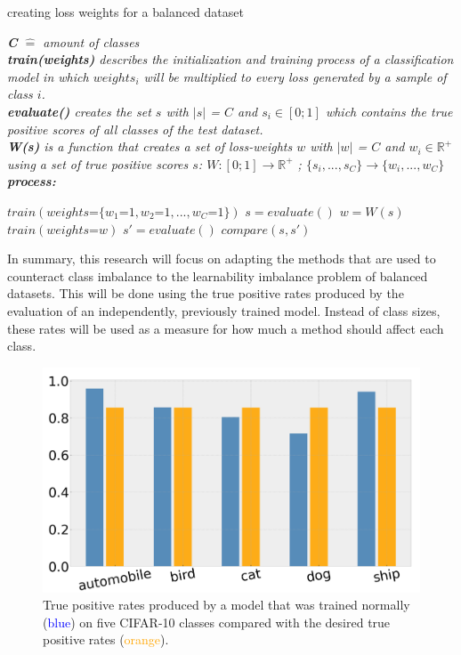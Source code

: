 \documentclass[journal]{IEEEtran}
\begin{document}
\begin{algorithm}[H]
        \caption{creating loss weights for a balanced dataset}

        \textit{\textbf{C} $\hat{=}$ amount of classes}
        \\ \textit{\textbf{train(weights)} describes the initialization and training process of a classification model in which $weights_i$ will be multiplied to every loss generated by a sample of class $i$.}
        \\ \textit{\textbf{evaluate()} creates the set $s$ with $\left|s\right|$ = $C$ and $s_i \in [0;1]$ which contains the true positive scores of all classes of the test dataset.}
        \\ \textit{\textbf{W(s)} is a function that creates a set of loss-weights $w$ with $\left|w\right|$ = $C$ and $w_i \in \mathbb{R}^{+}$ using a set of true positive scores $s$: $W: [0;1] \rightarrow \mathbb{R}^{+}$ ; $\{s_i,...,s_C\} \rightarrow \{w_i,...,w_C\}$ }
        \\ \textit{\textbf{process:}}
        \begin{algorithmic}[1]
         \STATE $train(weights\texttt{=}\{w_1\texttt{=}1, w_2\texttt{=}1, ..., w_C\texttt{=}1\})$
         \STATE $s = evaluate()$
         \STATE $w = W(s)$
         \STATE $train(weights\texttt{=}w)$
         \STATE $s' = evaluate()$
         \STATE $compare(s, s')$

        \end{algorithmic}
\end{algorithm}

In summary, this research will focus on adapting the methods that are used to counteract class imbalance to the learnability imbalance problem of balanced datasets.
This will be done using the true positive rates produced by the evaluation of an independently, previously trained model.
Instead of class sizes, these rates will be used as a measure for how much a method should affect each class.

\begin{figure}[h!]
        \includegraphics[width=\linewidth]{images/tp_comparison.png}
        \caption{True positive rates produced by a model that was trained normally (\textcolor{blue}{blue}) on five CIFAR-10 classes compared with the desired true positive rates (\textcolor{orange}{orange}).}
        \label{fig:tp_comparsion}
\end{figure}
\end{document}
